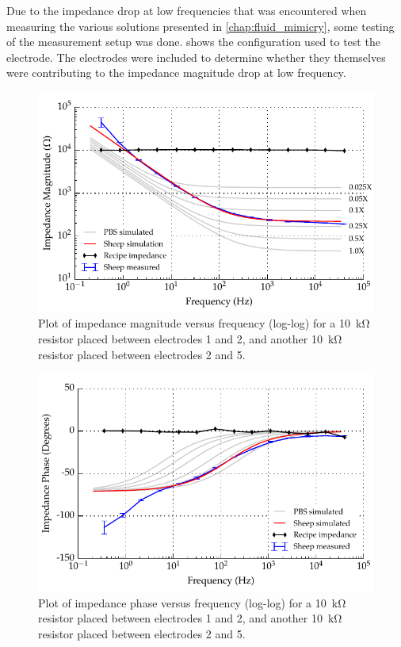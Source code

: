 Due to the impedance drop at low frequencies that was encountered when measuring the various solutions presented in \cref{chap:fluid_mimicry}, some testing of the measurement setup was done.
 shows the configuration used to test the electrode.
The electrodes were included to determine whether they themselves were contributing to the impedance magnitude drop at low frequency.


\begin{figure}
    \centering
    \includegraphics{content/appendices/Solution-Impedance-Measurements/graphics/run14_calibration_10k_noWater_ZVsF_graph_mag}
    \caption{\label{fig:calibration_10kRes_mag}Plot of impedance magnitude versus frequency (log-log) for a \SI{10}{\kilo\ohm} resistor placed between electrodes 1 and 2, and another \SI{10}{\kilo\ohm} resistor placed between electrodes 2 and 5.}
\end{figure}

\begin{figure}
    \centering
    \includegraphics{content/appendices/Solution-Impedance-Measurements/graphics/run14_calibration_10k_noWater_ZVsF_graph_phase}
    \caption{\label{fig:calibration_10kRes_phase}Plot of impedance phase versus frequency (log-log) for a \SI{10}{\kilo\ohm} resistor placed between electrodes 1 and 2, and another \SI{10}{\kilo\ohm} resistor placed between electrodes 2 and 5.}
\end{figure}


